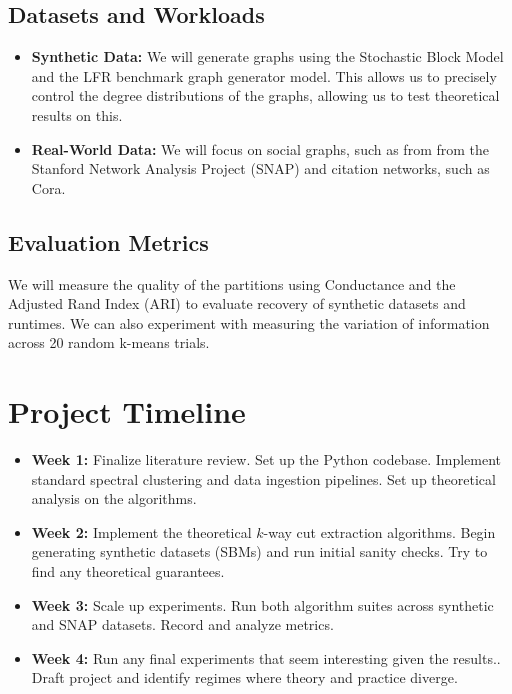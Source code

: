 \documentclass{article}
\begin{document}
\subsection{Datasets and Workloads}
\begin{itemize}
    \item \textbf{Synthetic Data:} We will generate graphs using the Stochastic Block Model and the LFR benchmark graph generator model. This allows us to precisely control the degree distributions of the graphs, allowing us to test theoretical results on this.
    
    \item \textbf{Real-World Data:} We will focus on social graphs, such as from from the Stanford Network Analysis Project (SNAP) and citation networks, such as Cora.
\end{itemize}

\subsection{Evaluation Metrics}
We will measure the quality of the partitions using Conductance and the Adjusted Rand Index (ARI) to evaluate recovery of synthetic datasets and runtimes. We can also experiment with measuring the variation of information across 20 random k-means trials.

\section{Project Timeline}

\begin{itemize}
    \item \textbf{Week 1: } Finalize literature review. Set up the Python  codebase. Implement standard spectral clustering and data ingestion pipelines. Set up theoretical analysis on the algorithms.
    \item \textbf{Week 2: } Implement the theoretical $k$-way cut extraction algorithms. Begin generating synthetic datasets (SBMs) and run initial sanity checks. Try to find any theoretical guarantees.
    \item \textbf{Week 3: } Scale up experiments. Run both algorithm suites across synthetic and SNAP datasets. Record and analyze metrics.
    \item \textbf{Week 4: } Run any final experiments that seem interesting given the results.. Draft project and identify regimes where theory and practice diverge. 
\end{itemize}
\end{document}
